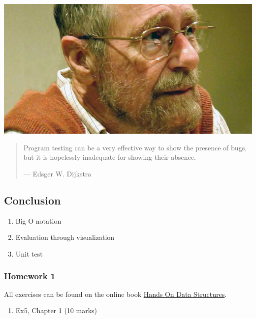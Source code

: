 \documentclass[aspectratio=169, 14pt]{beamer}
\begin{document}
\begin{frame}
    \begin{center}
        \includegraphics[height=.4\paperheight]{week2/dijkstra}
    \end{center}

   \begin{quote}
    Program testing can be a very effective way to show the presence of bugs, but it is hopelessly inadequate for showing their absence.
    \begin{flushright}
        --- Edsger W. Dijkstra
    \end{flushright}
   \end{quote} 

\end{frame}

\begin{frame}
    \section{\textcolor{darkmidnightblue}{Conclusion}}

    \begin{enumerate}
        \item Big O notation
        \item Evaluation through visualization
        \item Unit test
    \end{enumerate}
\end{frame}

\begin{frame}
    \frametitle{Homework 1}
All exercises can be found on the online book \href{https://chenzhongpu.github.io/data-structure-swufe/}{Hands On Data Structures}.    

\begin{enumerate}
    \item Ex5, Chapter 1 (10 marks)
\end{enumerate}
\end{frame}
\end{document}

